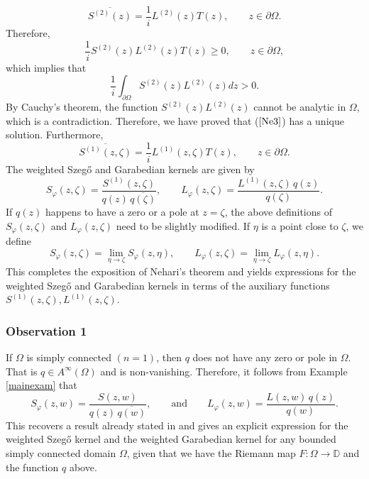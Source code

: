 \documentclass[11pt, reqno]{amsart}
\numberwithin{equation}{section}
\newcommand{\Om}{\Omega}
\begin{document}
\[
\overline{S^{(2)}(z)} = \frac{1}{i} L^{(2)}(z) T(z),
\quad \quad z\in \partial \Om.
\]
Therefore,
\[
\frac{1}{i} S^{(2)}(z)L^{(2)}(z) T(z) \geq 0,
\quad\quad z\in\partial\Omega,
\]
which implies that
\[
\frac{1}{i} \int_{\partial\Om}S^{(2)}(z)L^{(2)}(z) dz >0. 
\]
By Cauchy's theorem, the function $S^{(2)}(z)L^{(2)}(z)$ cannot be analytic in $\Om$, which is a contradiction. Therefore, we have proved that ($\ref{Ne3}$) has a unique solution. Furthermore,
\begin{equation}\label{S1L1}
\overline{S^{(1)}(z,\zeta)} = \frac{1}{i} L^{(1)}(z,\zeta) T(z),
\quad\quad z\in \partial\Om.
\end{equation}
The weighted Szeg\H{o} and Garabedian kernels are given by
\begin{equation}
	S_{\varphi}(z,\zeta) = \frac{S^{(1)}(z,\zeta)}{q(z)\, \overline{q(\zeta)}},
	\quad\quad
	L_{\varphi}(z,\zeta) = \frac{L^{(1)}(z,\zeta) \,q(z)}{q(\zeta)}.
\end{equation}
If $q(z)$ happens to have a zero or a pole at $z=\zeta$, the above definitions of $S_{\varphi}(z,\zeta)$ and $L_{\varphi}(z,\zeta)$ need to be slightly modified. If $\eta$ is a point close to $\zeta$, we define
\begin{equation}
S_{\varphi}(z,\zeta) = \lim_{\eta\rightarrow \zeta} S_{\varphi}(z,\eta),
\quad\quad 
L_{\varphi}(z,\zeta) = \lim_{\eta\rightarrow\zeta} L_{\varphi}(z,\eta).
\end{equation}
This completes the exposition of Nehari's theorem and yields expressions for the weighted Szeg\H{o} and Garabedian kernels in terms of the auxiliary functions $S^{(1)}(z, \zeta), L^{(1)}(z, \zeta)$. 

\subsubsection{\bf{Observation 1}}\label{SC1}

If $\Omega$ is simply connected $(n=1)$, then $q$ does not have any zero or pole in $\Omega$. That is $q\in A^{\infty}(\Om)$ and is non-vanishing. Therefore, it follows from Example \ref{mainexam} that
\begin{equation}
S_{\varphi}(z,w) = \frac{S(z,w)}{q(z)\,\overline{q(w)}},
\quad\quad \text{and} \quad\quad
L_{\varphi}(z,w) = \frac{L(z,w) \,q(z)}{q(w)}.
\end{equation}
This recovers a result already stated in \cite{Nehari, UM} and gives an explicit expression for the weighted Szeg\H{o} kernel and the weighted Garabedian kernel for any bounded simply connected domain $\Om$, given that we have the Riemann map $F:\Om\rightarrow\mathbb{D}$ and the function $q$ above.
\end{document}
